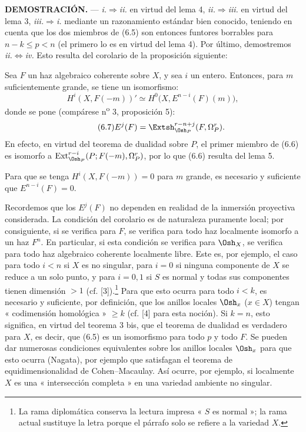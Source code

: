 \noindent\textbf{DEMOSTRACIÓN.} --- \textit{i.}$\Rightarrow$\textit{ii.} en
virtud del lema 4, \textit{ii.}$\Rightarrow$\textit{iii.} en virtud del lema 3,
\textit{iii.}$\Rightarrow$\textit{i.} mediante un razonamiento estándar bien conocido,
teniendo en cuenta que los dos miembros de (6.5) son entonces funtores borrables
para $n-k\leq p<n$ (el primero lo es en virtud del lema 4). Por último, demostremos
\textit{ii.}$\Leftrightarrow$\textit{iv.} Esto resulta del corolario de la
proposición siguiente:

 Sea $F$ un haz algebraico coherente sobre $X$, y
sea $i$ un entero. Entonces, para $m$ suficientemente grande, se tiene un isomorfismo:
\begin{equation}\tag{6.6}
  H^{i}(X,F(-m))'
  \simeq H^{0}\bigl(X,E^{n-i}(F)(m)\bigr),
\end{equation}
donde se pone (compárese n\textsuperscript{o} 3, proposición 5):
\begin{equation}\tag{6.7}
  E^{j}(F)=\Extsh_{\Osh_P}^{r-n+j}(F,\Omega_P^{r}).
\end{equation}
En efecto, en virtud del teorema de dualidad sobre $P$, el primer miembro de (6.6)
es isomorfo a
$\operatorname{Ext}_{\Osh_P}^{r-i}(P;F(-m),\Omega_P^{r})$, por lo que (6.6) resulta
del lema 5.

 Para que se tenga $H^{i}(X,F(-m))=0$ para $m$ grande, es
necesario y suficiente que $E^{n-i}(F)=0$.

Recordemos que los $E^{j}(F)$ no dependen en realidad de la inmersión proyectiva
considerada. La condición del corolario es de naturaleza puramente local; por consiguiente,
si se verifica para $F$, se verifica para todo haz localmente
isomorfo a un haz $F^{n}$. En particular, si esta condición se verifica
para $\Osh_X$, se verifica para todo haz algebraico coherente localmente
libre. Este es, por ejemplo, el caso para todo $i<n$ si $X$ es no singular, para
$i=0$ si ninguna componente de $X$ se reduce a un solo punto, y para $i=0,1$
si $S$ es normal y todas sus componentes tienen dimensión $>1$ (cf.
[3]).\footnote{La rama diplomática conserva la lectura impresa « $S$ es
normal »; la rama actual sustituye la letra porque el párrafo solo se refiere
a la variedad $X$.} Para que esto ocurra para todo
$i<k$, es necesario y suficiente, por definición, que los anillos locales
$\Osh_x$ ($x\in X$) tengan « codimensión homológica » $\geq k$ (cf. [4]
para esta noción). Si $k=n$, esto significa, en virtud del teorema 3 bis, que el
teorema de dualidad es verdadero para $X$, es decir, que (6.5) es un isomorfismo para
todo $p$ y todo $F$. Se pueden dar numerosas condiciones equivalentes sobre
los anillos locales $\Osh_x$ para que esto ocurra (Nagata), por ejemplo que
satisfagan el teorema de equidimensionalidad de Cohen--Macaulay. Así ocurre,
por ejemplo, si localmente $X$ es una « intersección completa » en una
variedad ambiente no singular.

